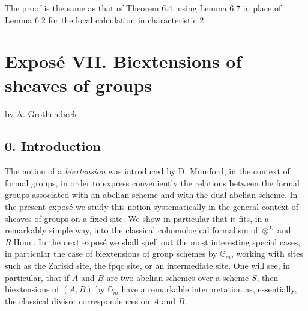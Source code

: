 \documentclass[11pt]{article}
\providecommand{\Gm}{\mathbb G_m}
\providecommand{\pr}{\operatorname{pr}}
\providecommand{\Ens}{\mathrm{Ens}}
\providecommand{\id}{\operatorname{id}}
\begin{document}
The proof is the same as that of Theorem 6.4, using Lemma 6.7 in place of Lemma 6.2 for the local calculation in characteristic \(2\).



\providecommand{\T}{\mathcal T}
\providecommand{\U}{\mathcal U}
\providecommand{\e}{\mathrm e}
\providecommand{\Ens}{\operatorname{Ens}}
\providecommand{\Alg}{\operatorname{Alg}}
\providecommand{\Homens}{\operatorname{Hom}_{\mathrm{ens}}}
\providecommand{\Homalg}{\operatorname{Hom}_{\mathrm{alg}}}
\providecommand{\Hompt}{\operatorname{Hom}_{\mathrm{pt}}}
\providecommand{\EXT}{\operatorname{EXT}}
\providecommand{\TORS}{\operatorname{TORS}}
\providecommand{\BITORSRIG}{\operatorname{BITORSRIG}}
\providecommand{\BITORSBIRIG}{\operatorname{BITORSBIRIG}}
\providecommand{\BITORS}{\operatorname{BITORS}}
\providecommand{\pr}{\operatorname{pr}}
\providecommand{\id}{\mathrm{id}}
\providecommand{\sym}{\mathrm{sym}}
\providecommand{\h}{\mathrm h}
\providecommand{\cA}{\mathcal A}
\providecommand{\cB}{\mathcal B}


\section*{Exposé VII. Biextensions of sheaves of groups}
\begin{center}
by A. Grothendieck
\end{center}

\subsection*{0. Introduction}

The notion of a \emph{biextension} was introduced by D. Mumford, in the context of formal groups, in order to express conveniently the relations between the formal groups associated with an abelian scheme and with the dual abelian scheme.  In the present exposé we study this notion systematically in the general context of sheaves of groups on a fixed site.  We show in particular that it fits, in a remarkably simple way, into the classical cohomological formalism of \(\otimes^{L}\) and \(R\!\operatorname{Hom}\).  In the next exposé we shall spell out the most interesting special cases, in particular the case of biextensions of group schemes by \(\Gm\), working with sites such as the Zariski site, the fpqc site, or an intermediate site.  One will see, in particular, that if \(A\) and \(B\) are two abelian schemes over a scheme \(S\), then biextensions of \((A,B)\) by \(\Gm\) have a remarkable interpretation as, essentially, the classical divisor correspondences on \(A\) and \(B\).
\end{document}
